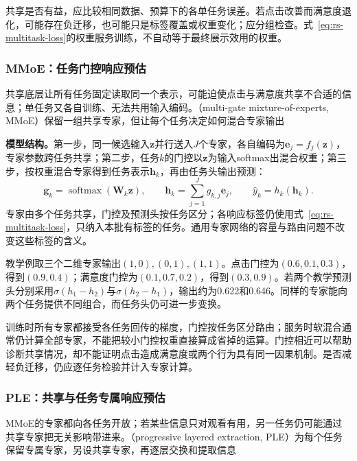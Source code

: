 共享是否有益，应比较相同数据、预算下的各单任务误差。若点击改善而满意度退化，可能存在负迁移，也可能只是标签覆盖或权重变化；应分组检查。式~\eqref{eq:rs-multitask-loss}的权重服务训练，不自动等于最终展示效用的权重。

\subsubsection{MMoE：任务门控响应预估}
\label{sec:rs-mmoe}

共享底层让所有任务固定读取同一个表示，可能迫使点击与满意度共享不合适的信息；单任务又各自训练、无法共用输入编码。（multi-gate mixture-of-experts, MMoE）保留一组共享专家，但让每个任务决定如何混合专家输出

\textbf{模型结构。}第一步，同一候选输入$\bm z$并行送入$J$个专家，各自编码为$\bm e_j=f_j(\bm z)$，专家参数跨任务共享；第二步，任务$k$的门控以$\bm z$为输入softmax出混合权重；第三步，按权重混合专家得到任务表示$\bm h_k$，再由任务头输出预测：
\begin{equation}
 \bm g_k=\operatorname{softmax}(\bm W_k\bm z),\qquad
 \bm h_k=\sum_{j=1}^{J}g_{k,j}\bm e_j,\qquad
 \widehat y_k=h_k(\bm h_k).
 \label{eq:rs-mmoe}
\end{equation}
专家由多个任务共享，门控及预测头按任务区分；各响应标签仍使用式~\eqref{eq:rs-multitask-loss}，只纳入本批有标签的任务。通用专家网络的容量与路由问题不改变这些标签的含义。

教学例取三个二维专家输出$(1,0),(0,1),(1,1)$。点击门控为$(0.6,0.1,0.3)$，得到$(0.9,0.4)$；满意度门控为$(0.1,0.7,0.2)$，得到$(0.3,0.9)$。若两个教学预测头分别采用$\sigma(h_1-h_2)$与$\sigma(h_2-h_1)$，输出约为0.622和0.646。同样的专家能向两个任务提供不同组合，而任务头仍可进一步变换。

训练时所有专家都接受各任务回传的梯度，门控按任务区分路由；服务时软混合通常仍计算全部专家，不能把较小门控权重直接算成省掉的运算。门控相近可以帮助诊断共享情况，却不能证明点击造成满意度或两个行为具有同一因果机制。是否减轻负迁移，仍应逐任务检验并计入专家计算。

\subsubsection{PLE：共享与任务专属响应预估}
\label{sec:rs-ple}

MMoE的专家都向各任务开放；若某些信息只对观看有用，另一任务仍可能通过共享专家把无关影响带进来。（progressive layered extraction, PLE）为每个任务保留专属专家，另设共享专家，再逐层交换和提取信息

